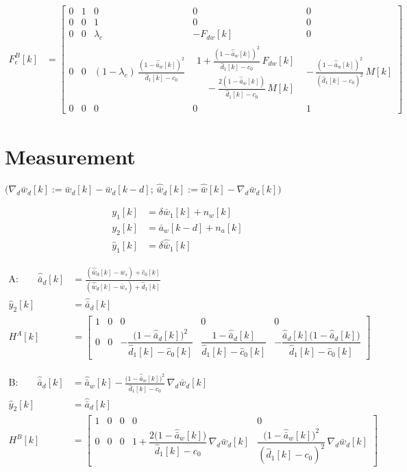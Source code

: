 \documentclass[11pt,a4paper,fontset=none]{ctexart}
\newcommand{\ba}{\bar{a}}
\newcommand{\bw}{\bar{w}}
\newcommand{\ah}{\hat{\ba}_w}
\newcommand{\ch}{\hat{c}_0}
\newcommand{\dhat}{\hat{d}_1}
\newcommand{\wh}{\hat{\bw}}
\newcommand{\ad}{\hat{\ba}_d}
\begin{document}
{\footnotesize\setlength{\arraycolsep}{2pt}
\begin{align*}
F_e^{B}[k] &= \begin{bmatrix}
0 & 1 & 0 & 0 & 0 \\
0 & 0 & 1 & 0 & 0 \\
0 & 0 & \lambda_c & -F_{dw}[k] & 0 \\
0 & 0 & (1-\lambda_c)\,\frac{(1-\ah[k])^{2}}{\dhat[k] - c_0}
      & \begin{array}{l} 1 + \frac{(1-\ah[k])^{2}}{\dhat[k] - c_0}\,F_{dw}[k] \\ \quad - \frac{2(1-\ah[k])}{\dhat[k] - c_0}\,M[k] \end{array}
      & -\,\frac{(1-\ah[k])^{2}}{(\dhat[k] - c_0)^{2}}\,M[k] \\
0 & 0 & 0 & 0 & 1
\end{bmatrix}
\end{align*}}

\section{Measurement}

$\bigl(\nabla_d\bw_d[k] := \bw_d[k] - \bw_d[k-d]$; $\wh_d[k] := \wh[k] - \nabla_d\bw_d[k]\bigr)$

\begin{align*}
y_1[k]      &= \delta\bw_1[k] + n_w[k] \\
y_2[k]      &= \ba_w[k-d] + n_a[k] \\
\hat y_1[k] &= \delta\hat{\bw}_1[k]
\end{align*}

\begin{align*}
\text{A:}\qquad
\ad[k]      &= \frac{(\wh_d[k] - \bw_s) + \ch[k]}{(\wh_d[k] - \bw_s) + \dhat[k]} \\
\hat y_2[k] &= \ad[k] \\
H^{A}[k]    &= \begin{bmatrix} 1 & 0 & 0 & 0 & 0 \\
               0 & 0 & -\dfrac{\bigl(1-\ad[k]\bigr)^{2}}{\dhat[k] - \ch[k]}
                     & \dfrac{1-\ad[k]}{\dhat[k] - \ch[k]}
                     & -\dfrac{\ad[k]\bigl(1-\ad[k]\bigr)}{\dhat[k] - \ch[k]} \end{bmatrix}
\end{align*}

\begin{align*}
\text{B:}\qquad
\ad[k]      &= \ah[k] - \frac{\bigl(1-\ah[k]\bigr)^{2}}{\dhat[k] - c_0}\,\nabla_d\bw_d[k] \\
\hat y_2[k] &= \ad[k] \\
H^{B}[k]    &= \begin{bmatrix} 1 & 0 & 0 & 0 & 0 \\
               0 & 0 & 0 & 1 + \dfrac{2\bigl(1-\ah[k]\bigr)}{\dhat[k] - c_0}\,\nabla_d\bw_d[k]
                     & \dfrac{\bigl(1-\ah[k]\bigr)^{2}}{(\dhat[k] - c_0)^{2}}\,\nabla_d\bw_d[k] \end{bmatrix}
\end{align*}
\end{document}
